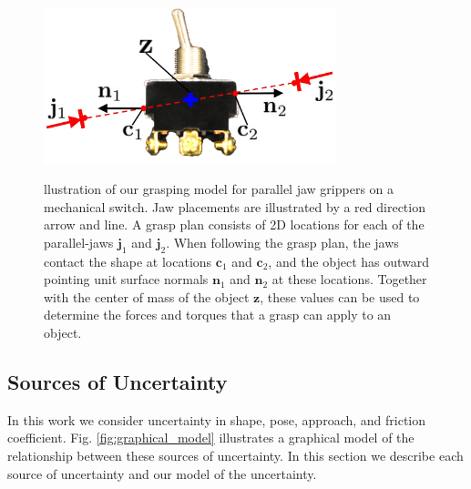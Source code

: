 \documentclass[a4paper, 10pt, conference]{ieeeconf}      %
\newcommand{\bc}{\mathbf{c}}
\newcommand{\bj}{\mathbf{j}}
\newcommand{\bn}{\mathbf{n}}
\newcommand{\bz}{\mathbf{z}}
\begin{document}

\begin{figure}[t!]
\centering
\includegraphics[width = 8.5cm, height = 5.25cm]{figures/bandit_grasp_model.jpg}
\caption{llustration of our grasping model for parallel jaw grippers on a mechanical switch. Jaw placements are illustrated by a red direction arrow and line. A grasp plan consists of 2D locations for each of the parallel-jaws $\bj_1$ and $\bj_2$. When following the grasp plan, the jaws contact the shape at locations $\bc_1$ and $\bc_2$, and the object has outward pointing unit surface normals $\bn_1$ and $\bn_2$ at these locations. Together with the center of mass of the object $\bz$, these values can be used to determine the forces and torques that a grasp can apply to an object.}
\vspace*{-2ex}
\label{fig:grasp_model}
\end{figure}

\subsection{Sources of Uncertainty}
In this work we consider uncertainty in shape, pose, approach, and friction coefficient.
Fig. \ref{fig:graphical_model} illustrates a graphical model of the relationship between these sources of uncertainty.
In this section we describe each source of uncertainty and our model of the uncertainty.
\end{document}
